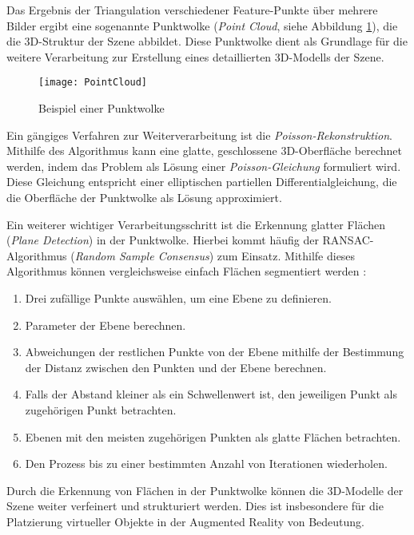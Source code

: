 Das Ergebnis der Triangulation verschiedener Feature-Punkte über mehrere Bilder ergibt eine sogenannte Punktwolke (\emph{Point Cloud}, siehe Abbildung \ref{fig:PointCloud}), die die 3D-Struktur der Szene abbildet. Diese Punktwolke dient als Grundlage für die weitere Verarbeitung zur Erstellung eines detaillierten 3D-Modells der Szene.

\begin{figure}
    \centering
    \texttt{[image: PointCloud]}
    \caption{Beispiel einer Punktwolke \cite{open3d2025pointcloud}\label{fig:PointCloud}}\par
\end{figure}

Ein gängiges Verfahren zur Weiterverarbeitung ist die \emph{Poisson-Rekonstruktion}. Mithilfe des Algorithmus kann eine glatte, geschlossene 3D-Oberfläche berechnet werden, indem das Problem als Lösung einer \emph{Poisson-Gleichung} formuliert wird. Diese Gleichung entspricht einer elliptischen partiellen Differentialgleichung, die die Oberfläche der Punktwolke als Lösung approximiert. \cite{kazhdan2006poisson}

Ein weiterer wichtiger Verarbeitungsschritt ist die Erkennung glatter Flächen (\emph{Plane Detection}) in der Punktwolke. Hierbei kommt häufig der RANSAC-Algorithmus (\emph{Random Sample Consensus}) zum Einsatz. Mithilfe dieses Algorithmus können vergleichsweise einfach Flächen segmentiert werden \cite{yang2010planeDetection, ajith2020ransac}:

\begin{enumerate}
    \item Drei zufällige Punkte auswählen, um eine Ebene zu definieren.
    \item Parameter der Ebene berechnen.
    \item Abweichungen der restlichen Punkte von der Ebene mithilfe der Bestimmung der Distanz zwischen den Punkten und der Ebene berechnen.
    \item Falls der Abstand kleiner als ein Schwellenwert ist, den jeweiligen Punkt als zugehörigen Punkt betrachten.
    \item Ebenen mit den meisten zugehörigen Punkten als glatte Flächen betrachten.
    \item Den Prozess bis zu einer bestimmten Anzahl von Iterationen wiederholen.
\end{enumerate}

Durch die Erkennung von Flächen in der Punktwolke können die 3D-Modelle der Szene weiter verfeinert und strukturiert werden. Dies ist insbesondere für die Platzierung virtueller Objekte in der Augmented Reality von Bedeutung. \cite{doerner2022virtual}

